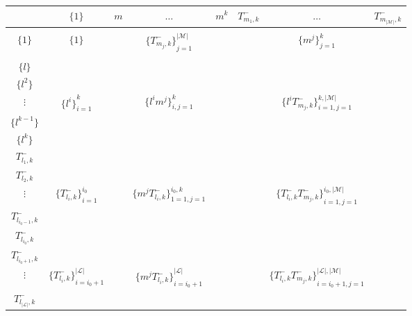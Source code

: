 \documentclass[12pt]{article}
\theoremstyle{definition}
\begin{document}
\begin{center}
\begin{tabular}{c|c::ccc:ccc} 
			                  &   $\big \lbrace1\big \rbrace$ & $m$  & $\dots$ & $m^k$ & $T_{m_1,k}^-$ &    $\dots$ &  $T_{m_{\vert \mathcal{M}\vert},k}^-$   \\ \hline
&&&&&&&\\
$\big \lbrace 1 \big \rbrace$  		&  $\big \lbrace1\big \rbrace$ && ${\big \lbrace T_{m_{j},k}^- \big \rbrace}_{j=1}^{\vert \mathcal{M}\vert}$ &&& $\big \lbrace m^j \big \rbrace_{j=1}^k$ &\\ 
&&&&\\ \hdashline
 \hdashline
$\big \lbrace l \big \rbrace$  &&&&&&&\\
$\big \lbrace l^2 \big \rbrace$  &&&&&&&\\
$\vdots$  				& ${\big \lbrace l^i \big \rbrace}_{i=1}^{k}$&& $\big \lbrace l^im^j \big \rbrace_{i,j=1}^k$ & && $\big \lbrace l^iT_{m_{j},k}^- \big \rbrace_{i=1,j=1}^{k,\vert \mathcal{M}\vert}$&\\
$\big \lbrace l^{k-1} \big \rbrace$  &&&&&&&\\
$\big \lbrace l^k \big \rbrace$  &&&&&&&\\
\hdashline
$T_{l_1,k}^-$  			&  				 &&&&&&\\
$T_{l_2,k}^-$  			&   				 &&&&&&\\
$\vdots$  				& ${\big \lbrace T_{l_{i},k}^- \big \rbrace}_{i=1}^{i_0}$ && $\big \lbrace m^jT_{l_{i},k}^- \big \rbrace_{1=1,j=1}^{i_0,k}$ && & ${\big \lbrace T_{l_{i},k}^-T_{m_{j},k}^- \big \rbrace}_{i=1,j=1}^{i_0,\vert \mathcal{M}\vert}$ &\\
$T_{l_{i_0-1},k}^-$  		&   &&&&&&\\
$T_{l_{i_0},k}^-$  		& &&&&&&\\ \hdashline
$T_{l_{i_0+1},k}^-$  		& &&&&&&\\
$\vdots$  				&  ${\big \lbrace T_{l_{i},k}^- \big \rbrace}_{i=i_0+1}^{\vert \mathcal{L} \vert}$ && ${\big \lbrace m^jT_{l_{i},k}^- \big \rbrace}_{i=i_0+1}^{\vert \mathcal{L} \vert}$&&&${\big \lbrace T_{l_{i},k}^-T_{m_{j},k}^- \big \rbrace}_{i=i_0+1,j=1}^{\vert \mathcal{L} \vert,\vert \mathcal{M} \vert}$ &\\
$T_{l_{\vert \mathcal{L} \vert},k}^-$  &&&&&&&\\ 
\end{tabular}
\end{center}
\vspace{1in}
\end{document}
